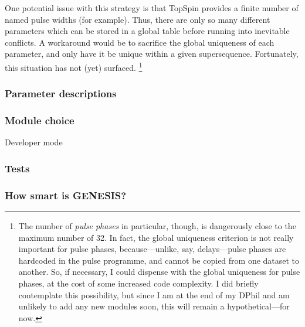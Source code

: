 One potential issue with this strategy is that TopSpin provides a finite number of named pulse widths (for example).
Thus, there are only so many different parameters which can be stored in a global table before running into inevitable conflicts.
A workaround would be to sacrifice the global uniqueness of each parameter, and only have it be unique within a given supersequence.
Fortunately, this situation has not (yet) surfaced.%
\footnote{The number of \textit{pulse phases} in particular, though, is dangerously close to the maximum number of 32. In fact, the global uniqueness criterion is not really important for pulse phases, because---unlike, say, delays---pulse phases are hardcoded in the pulse programme, and cannot be copied from one dataset to another. So, if necessary, I could dispense with the global uniqueness for pulse phases, at the cost of some increased code complexity. I did briefly contemplate this possibility, but since I am at the end of my DPhil and am unlikely to add any new modules soon, this will remain a hypothetical---for now.}


\subsubsection{Parameter descriptions}

\subsubsection{Module choice}

Developer mode

\subsubsection{Tests}
\subsubsection{How smart is GENESIS?}
